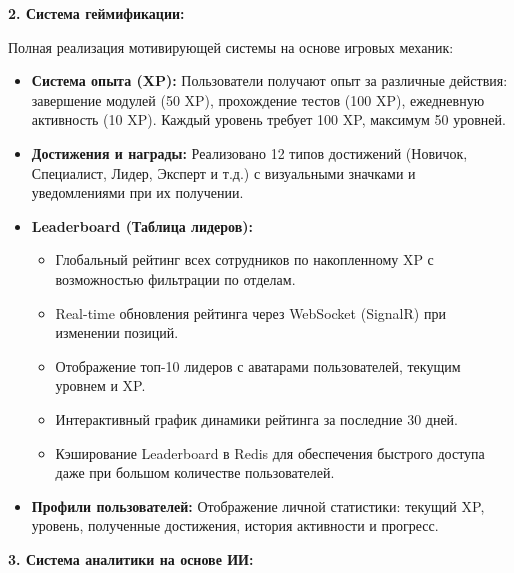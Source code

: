 \textbf{2. Система геймификации:}

Полная реализация мотивирующей системы на основе игровых механик:
\begin{itemize}
	\item \textbf{Система опыта (XP):} Пользователи получают опыт за различные действия: завершение модулей (50 XP), прохождение тестов (100 XP), ежедневную активность (10 XP). Каждый уровень требует 100 XP, максимум 50 уровней.
	
	\item \textbf{Достижения и награды:} Реализовано 12 типов достижений (Новичок, Специалист, Лидер, Эксперт и т.д.) с визуальными значками и уведомлениями при их получении.
	
	\item \textbf{Leaderboard (Таблица лидеров):} 
	\begin{itemize}
		\item Глобальный рейтинг всех сотрудников по накопленному XP с возможностью фильтрации по отделам.
		\item Real-time обновления рейтинга через WebSocket (SignalR) при изменении позиций.
		\item Отображение топ-10 лидеров с аватарами пользователей, текущим уровнем и XP.
		\item Интерактивный график динамики рейтинга за последние 30 дней.
		\item Кэширование Leaderboard в Redis для обеспечения быстрого доступа даже при большом количестве пользователей.
	\end{itemize}
	
	\item \textbf{Профили пользователей:} Отображение личной статистики: текущий XP, уровень, полученные достижения, история активности и прогресс.
\end{itemize}

\textbf{3. Система аналитики на основе ИИ:}

